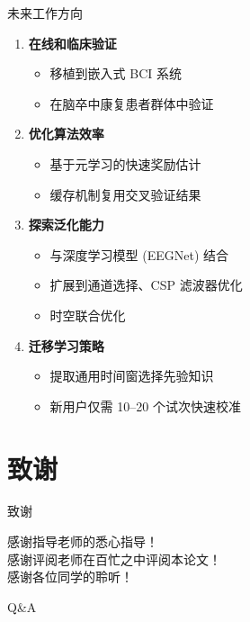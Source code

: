 \begin{frame}{未来工作方向}
    \begin{enumerate}
        \item \textbf{在线和临床验证}
        \begin{itemize}
            \item 移植到嵌入式 BCI 系统
            \item 在脑卒中康复患者群体中验证
        \end{itemize}
        
        \item \textbf{优化算法效率}
        \begin{itemize}
            \item 基于元学习的快速奖励估计
            \item 缓存机制复用交叉验证结果
        \end{itemize}
        
        \item \textbf{探索泛化能力}
        \begin{itemize}
            \item 与深度学习模型 (EEGNet) 结合
            \item 扩展到通道选择、CSP 滤波器优化
            \item 时空联合优化
        \end{itemize}
        
        \item \textbf{迁移学习策略}
        \begin{itemize}
            \item 提取通用时间窗选择先验知识
            \item 新用户仅需 10--20 个试次快速校准
        \end{itemize}
    \end{enumerate}
\end{frame}

\section{致谢}

\begin{frame}{致谢}
    \begin{center}
        \Large
        感谢指导老师的悉心指导！\\
        \vspace{0.5cm}
        感谢评阅老师在百忙之中评阅本论文！\\
        \vspace{0.5cm}
        感谢各位同学的聆听！
    \end{center}
\end{frame}

\begin{frame}
    \begin{center}
        {\Huge Q\&A}
    \end{center}
\end{frame}
